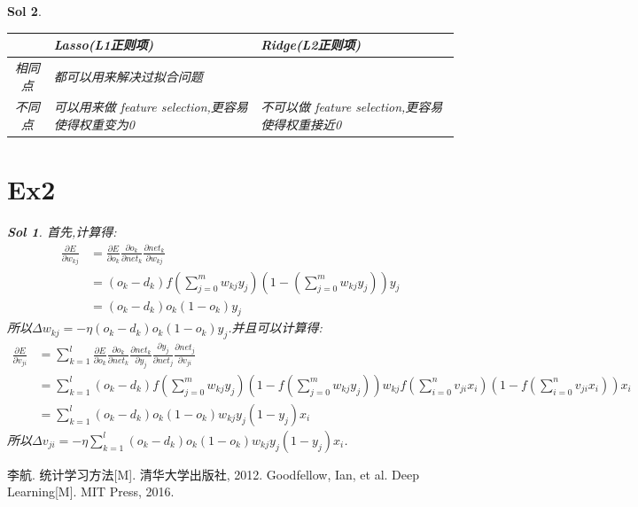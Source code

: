 \label{key}\documentclass[UTF8,a4paper,11pt]{ctexart}
\newtheorem{sol}{Sol}[section]
\begin{document}
\begin{sol}
\begin{center}
\begin{tabular}{c p{5cm} p{5cm}}
		\hline
		 & Lasso(L1正则项) & Ridge(L2正则项) \\
		\hline
		相同点 &都可以用来解决过拟合问题  \\
		不同点 & 可以用来做 feature selection,更容易使得权重变为0 & 不可以做 feature selection,更容易使得权重接近0\\
		\hline
	\end{tabular}
	\end{center}
\section{Ex2}
\begin{sol}
	首先,计算得:
	\begin{equation*}
		\begin{split}
			\frac{\partial E}{\partial w_{kj}}&=\frac{\partial E}{\partial o_{k}} \frac{\partial o_{k}}{\partial net_{k}} \frac{\partial net_{k}}{\partial w_{kj}}\\
			&=(o_{k}-d_{k})f(\sum_{j=0}^{m}w_{kj}y_{j})(1-(\sum_{j=0}^{m}w_{kj}y_{j}))y_{j}\\
			&=(o_{k}-d_{k})o_{k}(1-o_{k})y_{j}
		\end{split}
	\end{equation*}
	所以$\Delta w_{kj}=-\eta (o_{k}-d_{k})o_{k}(1-o_{k})y_{j}$.并且可以计算得:
	\begin{equation*}
		\begin{split}
			\frac{\partial E}{\partial v_{ji}}&=\sum_{k=1}^{l}\frac{\partial E}{\partial o_{k}} \frac{\partial o_{k}}{\partial net_{k}} \frac{\partial net_{k}}{\partial y_{j}} \frac{\partial y_{j}}{\partial net_{j}} \frac{\partial net_{j}}{\partial v_{ji}}\\
			&=\sum_{k=1}^{l}(o_{k}-d_{k})f(\sum_{j=0}^{m}w_{kj}y_{j})(1-f(\sum_{j=0}^{m}w_{kj}y_{j}))w_{kj}f(\sum_{i=0}^{n}v_{ji}x_{i})(1-f(\sum_{i=0}^{n}v_{ji}x_{i}))x_{i}\\
			&=\sum_{k=1}^{l}(o_{k}-d_{k})o_{k}(1-o_{k})w_{kj}y_{j}(1-y_{j})x_{i}
		\end{split}
	\end{equation*}
	所以$\Delta v_{ji}=-\eta \sum_{k=1}^{l}(o_{k}-d_{k})o_{k}(1-o_{k})w_{kj}y_{j}(1-y_{j})x_{i}$.
\end{sol}

\end{sol}






\newpage
\begin{thebibliography}{3}  
	 李航. 统计学习方法[M]. 清华大学出版社, 2012.
	 Goodfellow, Ian, et al. Deep Learning[M]. MIT Press, 2016. 	
\end{thebibliography}
\end{document}
